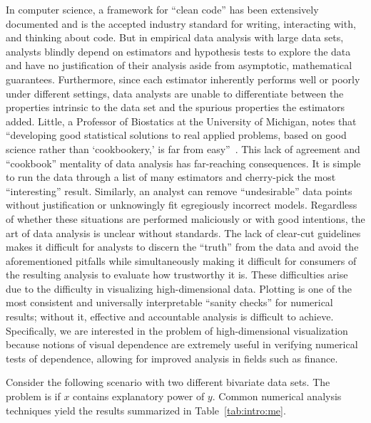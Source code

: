 In computer science, a framework for ``clean code'' has been extensively
documented and is the accepted industry standard for writing, interacting with,
and thinking about code. But in empirical data analysis with large data sets,
analysts blindly depend on estimators and hypothesis tests to explore the data
and have no justification of their analysis aside from asymptotic, mathematical
guarantees. Furthermore, since each estimator inherently performs well or poorly
under different settings, data analysts are unable to differentiate between the
properties intrinsic to the data set and the spurious properties the estimators
added. Little, a Professor of Biostatics at the University of Michigan, notes
that ``developing good statistical solutions to real applied problems, based on
good science rather than `cookbookery,' is far from easy''~\cite{little2013}.
This lack of agreement and ``cookbook'' mentality of data analysis has
far-reaching consequences. It is simple to run the data through a list of many
estimators and cherry-pick the most ``interesting'' result. Similarly, an
analyst can remove ``undesirable'' data points without justification or 
unknowingly fit egregiously incorrect models. Regardless of whether these 
situations are performed maliciously or with good intentions, the art of data 
analysis is unclear without standards. The lack of clear-cut guidelines makes 
it difficult for analysts to discern the ``truth'' from the data and avoid the 
aforementioned pitfalls while simultaneously making it difficult for consumers 
of the resulting analysis to evaluate how trustworthy it is. These difficulties 
arise due to the difficulty in visualizing high-dimensional data. Plotting is 
one of the most consistent and universally interpretable ``sanity checks'' for 
numerical results; without it, effective and accountable analysis is difficult 
to achieve. Specifically, we are interested in the problem of high-dimensional 
visualization because notions of visual dependence are extremely useful in 
verifying numerical tests of dependence, allowing for improved analysis in 
fields such as finance.

Consider the following scenario with two different bivariate data sets. The
problem is if $x$ contains explanatory power of $y$. Common numerical analysis
techniques yield the results summarized in Table~\ref{tab:intro:me}.

\tablespacing

